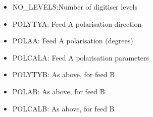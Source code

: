 \documentclass[letterpaper,10pt,english]{sphinxmanual}
\begin{document}
\begin{fulllineitems}
\begin{itemize}
\item {} 
NO\_LEVELS:Number of digitiser levels

\item {} 
POLYTYA:  Feed A polarisation direction

\item {} 
POLAA:    Feed A polarisation (degrees)

\item {} 
POLCALA:  Feed A polarisation parameters

\item {} 
POLYTYB:  As above, for feed B

\item {} 
POLAB:    As above, for feed B

\item {} 
POLCALB:  As above, for feed B

\end{itemize}

\end{fulllineitems}


\end{document}
